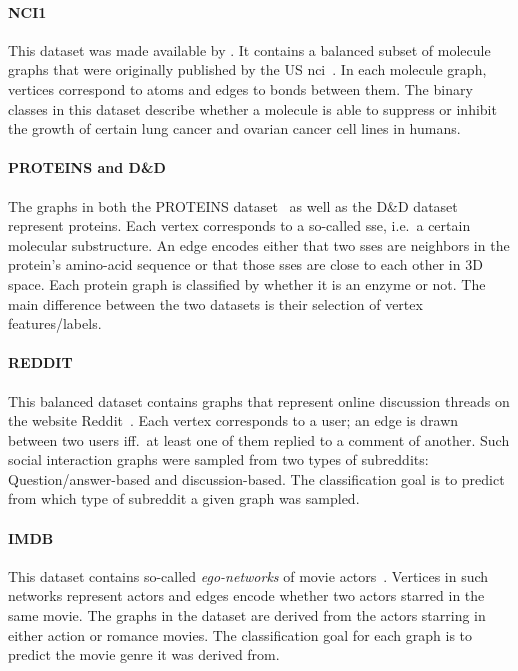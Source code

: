 \paragraph{NCI1}
This dataset was made available by \citet{Shervashidze2011}.
It contains a balanced subset of molecule graphs that were originally published by the US \ac{nci}~\cite{Wale2007}.
In each molecule graph, vertices correspond to atoms and edges to bonds between them.
The binary classes in this dataset describe whether a molecule is able to suppress or inhibit the growth of certain lung cancer and ovarian cancer cell lines in humans.

\paragraph{PROTEINS and D\&D}
The graphs in both the PROTEINS dataset~\cite{Borgwardt2005a} as well as the D\&D dataset~\cite{Dobson2003} represent proteins.
Each vertex corresponds to a so-called \ac{sse}, i.e.\ a certain molecular substructure.
An edge encodes either that two \acp{sse} are neighbors in the protein's amino-acid sequence or that those \acp{sse} are close to each other in 3D space.
Each protein graph is classified by whether it is an enzyme or not.
The main difference between the two datasets is their selection of vertex features/labels.

\paragraph{REDDIT}
This balanced dataset contains graphs that represent online discussion threads on the website Reddit~\cite{Yanardag2015}.
Each vertex corresponds to a user; an edge is drawn between two users iff.\ at least one of them replied to a comment of another.
Such social interaction graphs were sampled from two types of subreddits:
Question/answer-based and discussion-based.
The classification goal is to predict from which type of subreddit a given graph was sampled.

\paragraph{IMDB}
This dataset contains so-called \textit{ego-networks} of movie actors~\cite{Yanardag2015}.
Vertices in such networks represent actors and edges encode whether two actors starred in the same movie.
The graphs in the dataset are derived from the actors starring in either action or romance movies.
The classification goal for each graph is to predict the movie genre it was derived from.

